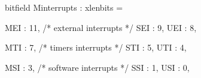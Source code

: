 bitfield Minterrupts : xlenbits = {
  MEI : 11, /* external interrupts */
  SEI : 9,
  UEI : 8,

  MTI : 7,  /* timers interrupts */
  STI : 5,
  UTI : 4,

  MSI : 3,  /* software interrupts */
  SSI : 1,
  USI : 0,
}
